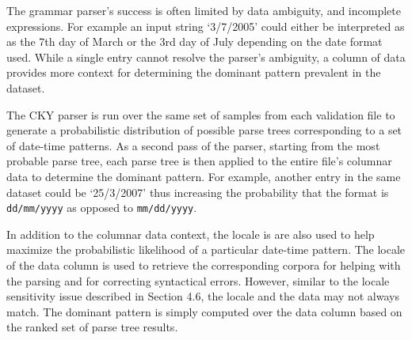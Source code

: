 The grammar parser's success is often limited by data ambiguity, and incomplete expressions. For example an input string `3/7/2005' could either be interpreted as as the 7th day of March or the 3rd day of July depending on the date format used. While a single entry cannot resolve the parser's ambiguity, a column of data provides more context for determining the dominant pattern prevalent in the dataset. 

The CKY parser is run over the same set of samples from each validation file to generate a probabilistic distribution of possible parse trees corresponding to a set of date-time patterns. As a second pass of the parser, starting from the most probable parse tree, each parse tree is then applied to the entire file's columnar data to determine the dominant pattern. For example, another entry in the same dataset could be `25/3/2007' thus increasing the probability that the format is \texttt{dd/mm/yyyy} as opposed to \texttt{mm/dd/yyyy}.

In addition to the  columnar data context, the locale is are also used to help maximize the probabilistic likelihood of a particular date-time pattern. The locale of the data column is used to retrieve the corresponding corpora for helping with the parsing and for correcting syntactical errors. However, similar to the locale sensitivity issue described in Section 4.6, the locale and the data may not always match. The dominant pattern is simply computed over the data column based on the ranked set of parse tree results.
